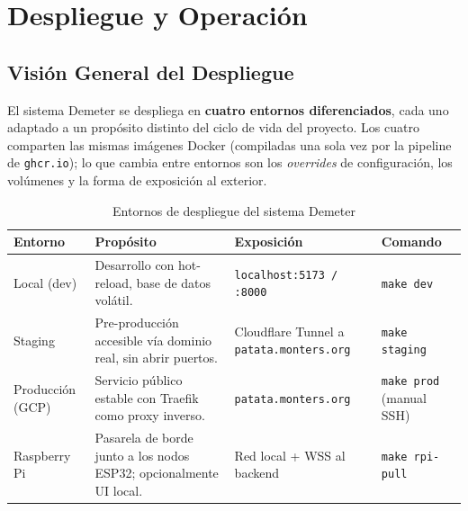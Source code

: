 \chapter{Despliegue y Operación}
\label{sec:despliegue}

\section{Visión General del Despliegue}

El sistema Demeter se despliega en \textbf{cuatro entornos diferenciados}, cada uno
adaptado a un propósito distinto del ciclo de vida del proyecto. Los cuatro comparten
las mismas imágenes Docker (compiladas una sola vez por la pipeline de
\texttt{ghcr.io}); lo que cambia entre entornos son los \textit{overrides} de
configuración, los volúmenes y la forma de exposición al exterior.

\begin{table}[H]
    \centering
    \caption{Entornos de despliegue del sistema Demeter}
    \begin{tabularx}{\textwidth}{lXll}
        \toprule
        \textbf{Entorno} & \textbf{Propósito}                                                   & \textbf{Exposición}              & \textbf{Comando} \\
        \midrule
        Local (dev)      & Desarrollo con hot-reload, base de datos volátil.                    & \texttt{localhost:5173 / :8000}  & \texttt{make dev} \\
        Staging          & Pre-producción accesible vía dominio real, sin abrir puertos.        & Cloudflare Tunnel a \texttt{patata.monters.org} & \texttt{make staging} \\
        Producción (GCP) & Servicio público estable con Traefik como proxy inverso.            & \texttt{patata.monters.org}      & \texttt{make prod} (manual SSH) \\
        Raspberry Pi     & Pasarela de borde junto a los nodos ESP32; opcionalmente UI local.  & Red local + WSS al backend       & \texttt{make rpi-pull} \\
        \bottomrule
    \end{tabularx}
    \label{tab:envs}
\end{table}


